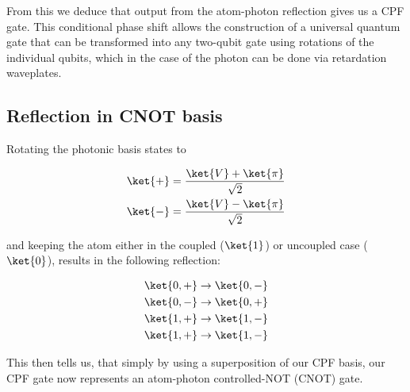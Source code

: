 From this we deduce that output from the atom-photon reflection gives us a CPF gate. This conditional phase shift allows the construction of a universal quantum gate that can be transformed into any two-qubit gate using rotations of the individual qubits, which in the case of the photon can be done via retardation waveplates.

\subsection{Reflection in CNOT basis}

Rotating the photonic basis states to

\begin{align*}
    \ket{+} &= \frac{\ket{V} + \ket{\pi}}{\sqrt{2}}\\
    \ket{-} &= \frac{\ket{V} - \ket{\pi}}{\sqrt{2}}
\end{align*}

and keeping the atom either in the coupled ($\ket{1}$) or uncoupled case ($\ket{0}$), results in the following reflection:

\begin{align*}
    \ket{0,+} &\rightarrow \ket{0,-}\\
    \ket{0,-} &\rightarrow \ket{0,+}\\
    \ket{1,+} &\rightarrow \ket{1,-}\\
    \ket{1,+} &\rightarrow \ket{1,-}\\
\end{align*}

This then tells us, that simply by using a superposition of our CPF basis, our CPF gate now represents an atom-photon controlled-NOT (CNOT) gate.

